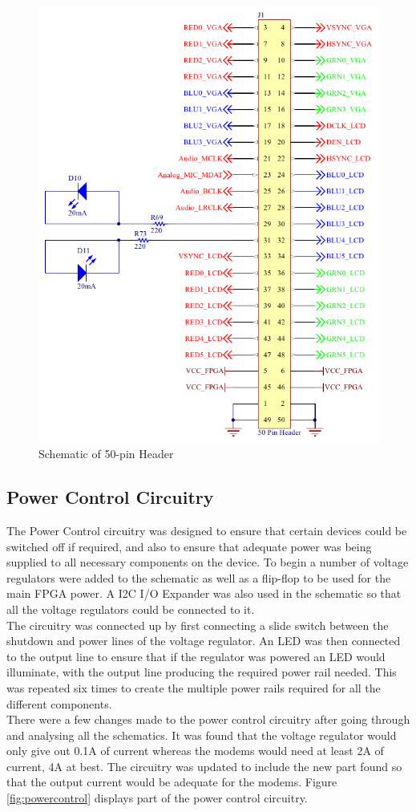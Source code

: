 \begin{figure}
	\includegraphics[width=0.5\linewidth]{Figures/50_pin_header.pdf}\centering
	\caption{Schematic of 50-pin Header}
	\label{fig:header}
\end{figure}

\subsection{Power Control Circuitry}
\label{chap:batt}
	The Power Control circuitry was designed to ensure that certain devices could be switched off if required, and also to ensure that adequate power was being supplied to all necessary components on the device. 
To begin a number of voltage regulators were added to the schematic as well as a flip-flop to be used for the main FPGA power. 
A I2C I/O Expander was also used in the schematic so that all the voltage regulators could be connected to it.\\

	The circuitry was connected up by first connecting a slide switch between the shutdown and power lines of the voltage regulator. 
An LED was then connected to the output line to ensure that if the regulator was powered an LED would illuminate, with the output line producing the required power rail needed. 
This was repeated six times to create the multiple power rails required for all the different components.\\

	There were a few changes made to the power control circuitry after going through and analysing all the schematics. 
It was found that the voltage regulator would only give out 0.1A of current whereas the modems would need at least 2A of current, 4A at best. 
The circuitry was updated to include the new part found so that the output current would be adequate for the modems. 
Figure \ref{fig:powercontrol} displays part of the power control circuitry. \\

